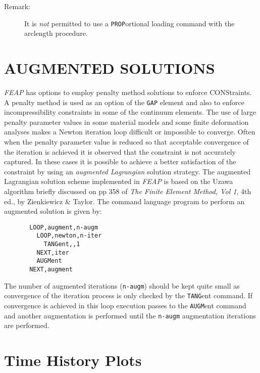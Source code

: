 \begin{description}
\item[Remark:]{It is {\it not} permitted to use a {\tt PROP}ortional loading
command with the arclength procedure.}
\end{description}

\section[Augmented Solutions]{AUGMENTED SOLUTIONS}
\label{augment}

{\sl FEAP} has options to employ penalty method solutions to enforce
CONStraints.  A penalty method is used as an option of the {\tt GAP}
element and also to enforce incompressibility constraints in some of
the continuum elements.  The use of large penalty parameter
values in some material
models and some finite deformation analyses makes a
Newton iteration loop difficult or impossible to converge.  Often
when the penalty parameter value is reduced so that acceptable convergence
of the iteration is achieved it is observed that the constraint is not
accurately captured.  In these cases it is possible to achieve a better
satisfaction of the constraint by using an {\it augmented Lagrangian}
solution strategy.  The augmented Lagrangian solution scheme implemented
in {\sl FEAP} is based on the Uzawa algorithm briefly discussed on pp 358
of {\it The Finite Element Method, Vol 1}, 4th ed., by Zienkiewicz \&
Taylor.  The command language program to perform an augmented solution
is given by:
\begin{verbatim}
       LOOP,augment,n-augm
         LOOP,newton,n-iter
           TANGent,,1
         NEXT,iter
         AUGMent
       NEXT,augment
\end{verbatim}
The number of augmented iterations ({\tt n-augm}) should be kept quite
small as convergence of the iteration process is only checked by the
{\tt TANG}ent command.  If convergence is achieved in this loop execution
passes to the {\tt AUGM}ent command and another augmentation is performed
until the {\tt n-augm} augmentation iterations are performed.

\section{Time History Plots}
\label{tplot}

